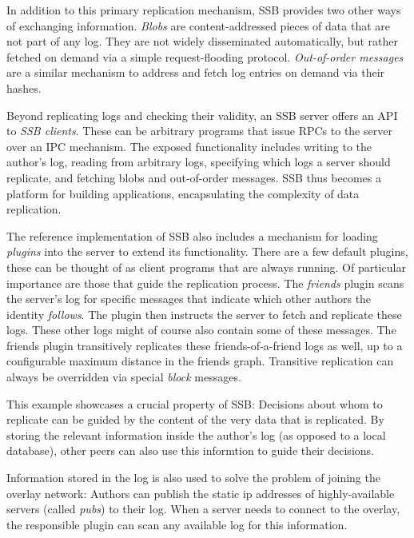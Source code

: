 \documentclass[sigconf]{acmart}
\begin{document}
In addition to this primary replication mechanism, SSB provides two other ways of exchanging information. {\em Blobs} are content-addressed pieces of data that are not part of any log. They are not widely disseminated automatically, but rather fetched on demand via a simple request-flooding protocol. {\em Out-of-order messages} are a similar mechanism to address and fetch log entries on demand via their hashes.

Beyond replicating logs and checking their validity, an SSB server offers an API to {\em SSB clients}. These can be arbitrary programs that issue RPCs to the server over an IPC mechanism. The exposed functionality includes writing to the author's log, reading from arbitrary logs, specifying which logs a server should replicate, and fetching blobs and out-of-order messages. SSB thus becomes a platform for building applications, encapsulating the complexity of data replication.

The reference implementation of SSB also includes a mechanism for loading {\em plugins} into the server to extend its functionality. There are a few default plugins, these can be thought of as client programs that are always running. Of particular importance are those that guide the replication process. The {\em friends} plugin scans the server's log for specific messages that indicate which other authors the identity {\em follows}. The plugin then instructs the server to fetch and replicate these logs. These other logs might of course also contain some of these messages. The friends plugin transitively replicates these friends-of-a-friend logs as well, up to a configurable maximum distance in the friends graph. Transitive replication can always be overridden via special {\em block} messages.

This example showcases a crucial property of SSB: Decisions about whom to replicate can be guided by the content of the very data that is replicated. By storing the relevant information inside the author's log (as opposed to a local database), other peers can also use this informtion to guide their decisions.

Information stored in the log is also used to solve the problem of joining the overlay network: Authors can publish the static ip addresses of highly-available servers (called {\em pubs}) to their log. When a server needs to connect to the overlay, the responsible plugin can scan any available log for this information.
\end{document}
